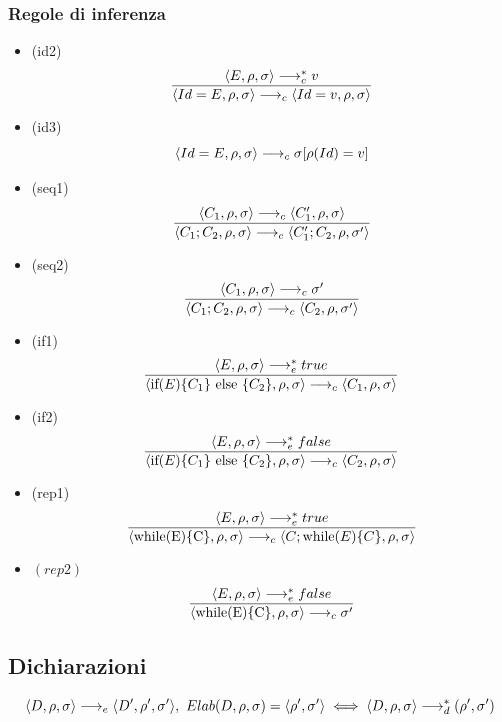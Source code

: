 \documentclass{article}
\begin{document}
\subsubsection*{Regole di inferenza}
\begin{itemize}
  \item (id2)
        \[\frac
          {\langle E,\rho,\sigma \rangle \longrightarrow_c^* v}
          {\langle Id = E,\rho,\sigma \rangle \longrightarrow_c \langle Id = v,\rho,\sigma \rangle}\]
  \item (id3)
        \[\langle Id = E,\rho,\sigma \rangle \longrightarrow_c \sigma[\rho(Id) = v]\]

  \item (seq1)
        \[\frac
          {\langle C_1,\rho,\sigma \rangle \longrightarrow_c \langle C_1',\rho,\sigma \rangle}
          {\langle C_1;C_2,\rho,\sigma \rangle \longrightarrow_c \langle C_1';C_2,\rho,\sigma' \rangle}\]
  \item (seq2)
        \[\frac
          {\langle C_1,\rho,\sigma \rangle \longrightarrow_c \sigma'}
          {\langle C_1;C_2,\rho,\sigma \rangle \longrightarrow_c \langle C_2,\rho,\sigma' \rangle}\]

  \item (if1)
        \[\frac
          {\langle E,\rho,\sigma \rangle \longrightarrow_e^* true}
          {\langle \text{if($E$)\{$C_1$\} else \{$C_2$\}},\rho,\sigma \rangle \longrightarrow_c \langle C_1,\rho,\sigma \rangle}\]
  \item (if2)
        \[\frac
          {\langle E,\rho,\sigma \rangle \longrightarrow_e^* false}
          {\langle \text{if($E$)\{$C_1$\} else \{$C_2$\}},\rho,\sigma \rangle \longrightarrow_c \langle C_2,\rho,\sigma \rangle}\]

  \item (rep1)
        \[\frac
          {\langle E,\rho,\sigma \rangle \longrightarrow_e^* true}
          {\langle \text{while(E)\{C\}},\rho,\sigma \rangle \longrightarrow_c \langle C;\text{while($E$)\{$C$\}},\rho,\sigma \rangle}\]
  \item \((rep2)\)
        \[\frac
          {\langle E,\rho,\sigma \rangle \longrightarrow_e^* false}
          {\langle \text{while(E)\{C\}},\rho,\sigma \rangle \longrightarrow_c \sigma'}\]
\end{itemize}
\subsection*{Dichiarazioni}
\[\langle D,\rho,\sigma \rangle \longrightarrow_e \langle D',\rho',\sigma' \rangle,\ Elab(D,\rho,\sigma) = \langle \rho',\sigma' \rangle \iff \langle D,\rho,\sigma \rangle \longrightarrow_d^* (\rho',\sigma')\]
\end{document}
